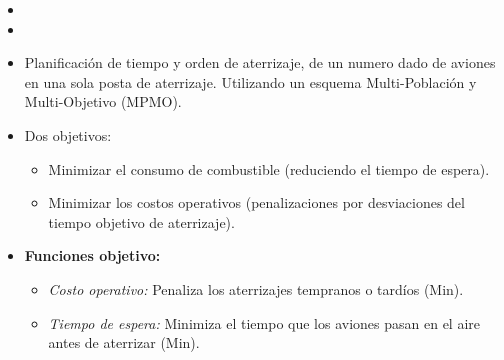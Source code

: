 
\begin{frame}
    \begin{itemize}
        \item {}
        \item {}
    \end{itemize}
\end{frame}

\begin{frame}{\parencite{shirini_multi-objective_2024}}

    \begin{itemize}
        \item Planificación de tiempo y orden de aterrizaje, de un numero dado de aviones en una sola posta de aterrizaje. Utilizando un esquema Multi-Población y Multi-Objetivo (MPMO).
        \item Dos objetivos:
              \begin{itemize}
                  \item Minimizar el consumo de combustible (reduciendo el tiempo de espera).
                  \item Minimizar los costos operativos (penalizaciones por desviaciones del tiempo objetivo de aterrizaje).
              \end{itemize}
        \item \textbf{Funciones objetivo:}
              \begin{itemize}
                  \item \textit{Costo operativo:} Penaliza los aterrizajes tempranos o tardíos (Min).\\ 
                  \item \textit{Tiempo de espera:} Minimiza el tiempo que los aviones pasan en el aire antes de aterrizar (Min).\\ 
              \end{itemize}
    \end{itemize}

\end{frame}

